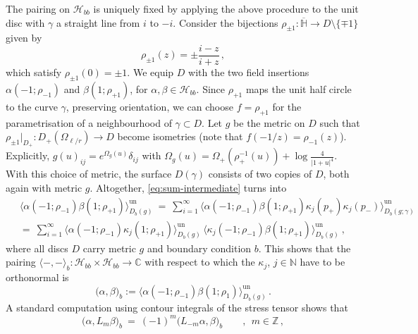 \documentclass[11pt,a4paper]{article}
\numberwithin{equation}{section}
\begin{document}
The pairing  on $\mathcal{H}_{bb}$ is uniquely fixed by applying the above procedure to the unit disc with $\gamma$ a straight line from $i$ to $-i$. Consider the bijections $\rho_{\pm1} : \overline{\mathbb{H}} \to D \setminus \{\mp1\}$ given by
\begin{equation}\label{eq:disc-coordinates-for-pairing}
\rho_{\pm 1}(z) = \pm \frac{i-z}{i+z} \,,
\end{equation}
which satisfy $\rho_{\pm 1}(0) = \pm 1$.
We equip $D$ with the two field insertions $\alpha(-1;\rho_{-1})$ and $\beta(1;\rho_{+1})$, for $\alpha,\beta \in \mathcal{H}_{bb}$.
Since $\rho_{+1}$ maps the unit half circle to the curve $\gamma$, preserving orientation, we can choose $f = \rho_{+1}$ for the parametrisation of a neighbourhood of $\gamma \subset D$. 
Let $g$ be the metric on $D$ such that $\rho_{\pm 1} |_{D_+} : D_+(\Omega_{\ell/r}) \to D$ become isometries (note that $f(-1/z) = \rho_{-1}(z)$). Explicitly, $g(u)_{ij} = e^{\Omega_g(u)} \delta_{ij}$ with $\Omega_g(u) = \Omega_+(\rho_+^{-1}(u))+\log \frac{4}{|1+u|^4}$.
With this choice of metric, the surface $D(\gamma)$ consists of two copies of $D$, both again with metric $g$. Altogether, \eqref{eq:sum-intermediate} turns into
\begin{align}
&\big\langle
    \alpha(-1;\rho_{-1}) \beta(1;\rho_{+1}) 
\big\rangle^\mathrm{un}_{D_b(g)}
~=~
\sum_{i=1}^\infty
\big\langle \alpha(-1;\rho_{-1}) \beta(1;\rho_{+1}) \kappa_j(p_+) \kappa_j(p_-) \big\rangle^\mathrm{un}_{D_b(g;\gamma)}
\nonumber\\
~&=~
\sum_{i=1}^\infty
\big\langle
\alpha(-1;\rho_{-1}) \kappa_j(1;\rho_{+1}) 
\big\rangle^\mathrm{un}_{D_b(g)}
\,
\big\langle
\kappa_j(-1;\rho_{-1}) \beta(1;\rho_{+1})
\big\rangle^\mathrm{un}_{D_b(g)} ~,
\label{eq:disc-check-1}
\end{align}
where all discs $D$ carry metric $g$ and boundary condition $b$.
This shows that the pairing $\langle - , - \rangle_b : \mathcal{H}_{bb} \times \mathcal{H}_{bb} \to \mathbb{C}$ with respect to which the $\kappa_j$, $j \in \mathbb{N}$ have to be orthonormal is
\begin{equation}\label{eq:pairing}
	\big( \alpha , \beta \big)_b
	:= \big\langle \alpha(-1;\rho_{-1}) \beta(1;\rho_1) \big\rangle^\mathrm{un}_{D_b(g)} \,.
\end{equation}
A standard computation using contour integrals of the stress tensor shows that
%
\begin{equation}\label{eq:pairing2}
	\big( \alpha , L_m \beta \big)_b
	~=~
	(-1)^m\big( L_{-m} \alpha , \beta \big)_b
	\qquad , ~~ m \in \mathbb{Z} \,,
\end{equation}
\end{document}
